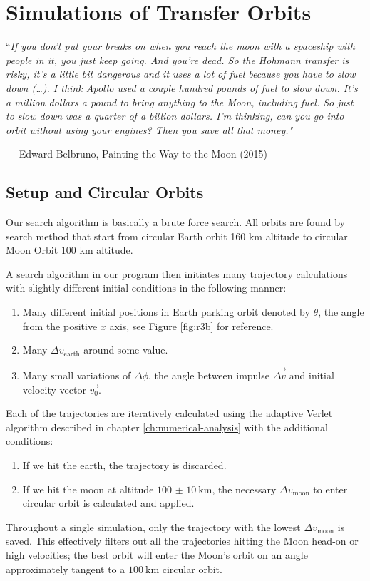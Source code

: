 \chapter{Simulations of Transfer Orbits} \label{ch:simulations-of-transfer orbits}
\epigraph{``\itshape{If you don’t put your breaks on when you reach the moon with a spaceship with people in it, you just keep going. And you’re dead. So the Hohmann transfer is risky, it’s a little bit dangerous and it uses a lot of fuel because you have to slow down (…). I think Apollo used a couple hundred pounds of fuel to slow down. It’s a million dollars a pound to bring anything to the Moon, including fuel. So just to slow down was a quarter of a billion dollars. I’m thinking, can you go into orbit without using your engines? Then you save all that money.}"}{--- \textup{Edward Belbruno}, Painting the Way to the Moon (2015)}


\section{Setup and Circular Orbits}
Our search algorithm is basically a brute force search. All orbits are found by search method that start from circular Earth orbit 160 km altitude to circular Moon Orbit 100 km altitude.

A search algorithm in our program then initiates many trajectory calculations with slightly different initial conditions in the following manner:
\begin{enumerate}
    \item Many different initial positions in Earth parking orbit denoted by $\theta$, the angle from the positive $x$ axis, see Figure \ref{fig:r3b} for reference. 
    \item Many $\Delta v_{\text{earth}}$ around some value.
    \item Many small variations of $\Delta \phi$, the angle between impulse $\vec{\Delta v}$ and initial velocity vector $\vec{v_0}$.
\end{enumerate}

Each of the trajectories are iteratively calculated using the adaptive Verlet algorithm described in chapter \ref{ch:numerical-analysis} with the additional conditions:
\begin{enumerate}
    \item If we hit the earth, the trajectory is discarded.
    \item If we hit the moon at altitude $\SI[separate-uncertainty=true]{100(10)}{\km}$, the necessary $\Delta v_{\text{moon}}$ to enter circular orbit is calculated and applied.
\end{enumerate}
Throughout a single simulation, only the trajectory with the lowest $\Delta v_{\text{moon}}$ is saved. This effectively filters out all the trajectories hitting the Moon head-on or high velocities; the best orbit will enter the Moon's orbit on an angle approximately tangent to a $\SI{100}{\km}$ circular orbit.



